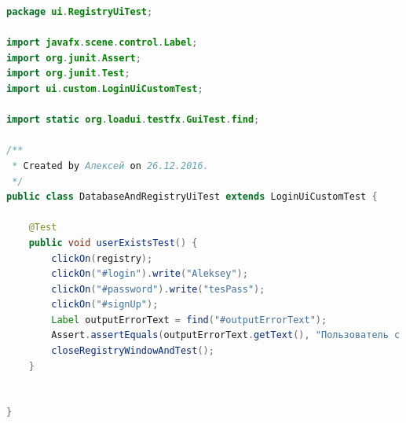 \documentclass[a4paper,12pt]{article}
\begin{document}
\begin{lstlisting}[language=java, caption=код модуля DatabaseAndRegistryUiTest.java]
package ui.RegistryUiTest;

import javafx.scene.control.Label;
import org.junit.Assert;
import org.junit.Test;
import ui.custom.LoginUiCustomTest;

import static org.loadui.testfx.GuiTest.find;

/**
 * Created by Алексей on 26.12.2016.
 */
public class DatabaseAndRegistryUiTest extends LoginUiCustomTest {

    @Test
    public void userExistsTest() {
        clickOn(registry);
        clickOn("#login").write("Aleksey");
        clickOn("#password").write("tesPass");
        clickOn("#signUp");
        Label outputErrorText = find("#outputErrorText");
        Assert.assertEquals(outputErrorText.getText(), "Пользователь с логином: Aleksey существует!");
        closeRegistryWindowAndTest();
    }


}
\end{lstlisting}
\end{document}
